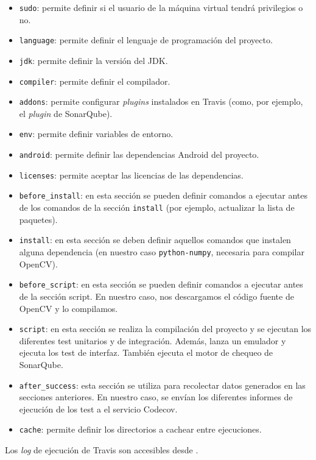 \begin{itemize}
\tightlist
\item
  \texttt{sudo}: permite definir si el usuario de la máquina virtual
  tendrá privilegios o no.
\item
  \texttt{language}: permite definir el lenguaje de programación del
  proyecto.
\item
  \texttt{jdk}: permite definir la versión del JDK.
\item
  \texttt{compiler}: permite definir el compilador.
\item
  \texttt{addons}: permite configurar \emph{plugins} instalados en
  Travis (como, por ejemplo, el \emph{plugin} de SonarQube).
\item
  \texttt{env}: permite definir variables de entorno.
\item
  \texttt{android}: permite definir las dependencias Android del
  proyecto.
\item
  \texttt{licenses}: permite aceptar las licencias de las dependencias.
\item
  \texttt{before\_install}: en esta sección se pueden definir comandos a
  ejecutar antes de los comandos de la sección \texttt{install} (por ejemplo,
  actualizar la lista de paquetes).
\item
  \texttt{install}: en esta sección se deben definir aquellos comandos
  que instalen alguna dependencia (en nuestro caso
  \texttt{python-numpy}, necesaria para compilar OpenCV).
\item
  \texttt{before\_script}: en esta sección se pueden definir comandos a
  ejecutar antes de la sección script. En nuestro caso, nos descargamos
  el código fuente de OpenCV y lo compilamos.
\item
  \texttt{script}: en esta sección se realiza la compilación del
  proyecto y se ejecutan los diferentes test unitarios y de integración.
  Además, lanza un emulador y ejecuta los test de interfaz. También
  ejecuta el motor de chequeo de SonarQube.
\item
  \texttt{after\_success}: esta sección se utiliza para recolectar datos
  generados en las secciones anteriores. En nuestro caso, se envían los
  diferentes informes de ejecución de los test a el servicio Codecov.
\item
  \texttt{cache}: permite definir los directorios a cachear entre
  ejecuciones.
\end{itemize}

Los \emph{log} de ejecución de Travis son accesibles desde
\citep{travis:gobees}.

